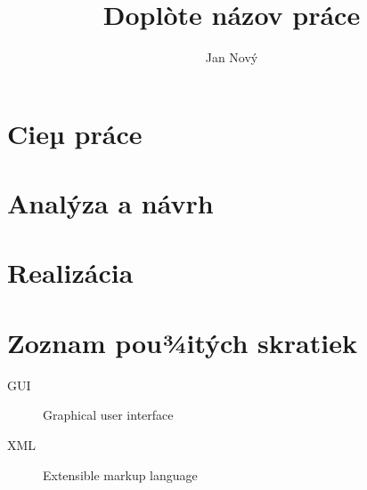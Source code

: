 \documentclass[thesis=B,slovak]{FITthesis}[2019/03/21]
\title{Doplòte názov práce}
\author{Jan Nový} %
\begin{document}

\begin{introduction}
\end{introduction}

\chapter{Cieµ práce}

\chapter{Analýza a návrh}

\chapter{Realizácia}

\begin{conclusion}
\end{conclusion}




\appendix

\chapter{Zoznam pou¾itých skratiek}
\begin{description}
	\item[GUI] Graphical user interface
	\item[XML] Extensible markup language
\end{description}
\end{document}
